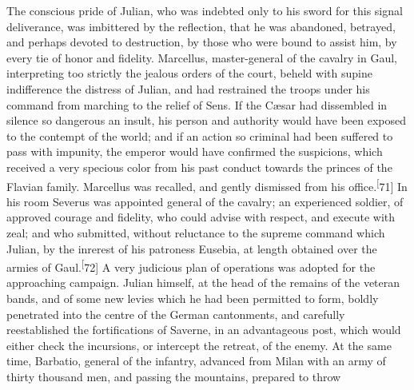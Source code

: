 

The conscious pride of Julian, who was indebted only to his sword
for this signal deliverance, was imbittered by the reflection,
that he was abandoned, betrayed, and perhaps devoted to
destruction, by those who were bound to assist him, by every tie
of honor and fidelity. Marcellus, master-general of the cavalry
in Gaul, interpreting too strictly the jealous orders of the
court, beheld with supine indifference the distress of Julian,
and had restrained the troops under his command from marching to
the relief of Sens. If the Cæsar had dissembled in silence so
dangerous an insult, his person and authority would have been
exposed to the contempt of the world; and if an action so
criminal had been suffered to pass with impunity, the emperor
would have confirmed the suspicions, which received a very
specious color from his past conduct towards the princes of the
Flavian family. Marcellus was recalled, and gently dismissed from
his office.\textsuperscript[71] In his room Severus was appointed general of the
cavalry; an experienced soldier, of approved courage and
fidelity, who could advise with respect, and execute with zeal;
and who submitted, without reluctance to the supreme command
which Julian, by the inrerest of his patroness Eusebia, at length
obtained over the armies of Gaul.\textsuperscript[72] A very judicious plan of
operations was adopted for the approaching campaign. Julian
himself, at the head of the remains of the veteran bands, and of
some new levies which he had been permitted to form, boldly
penetrated into the centre of the German cantonments, and
carefully reestablished the fortifications of Saverne, in an
advantageous post, which would either check the incursions, or
intercept the retreat, of the enemy. At the same time, Barbatio,
general of the infantry, advanced from Milan with an army of
thirty thousand men, and passing the mountains, prepared to throw
